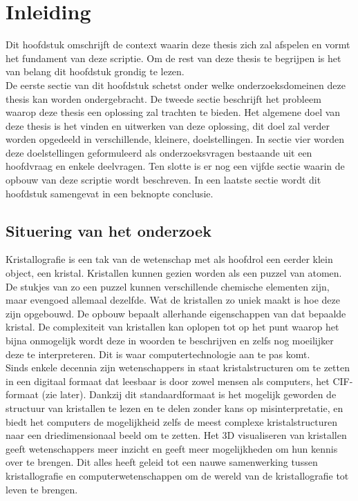 

\chapter{Inleiding}
Dit hoofdstuk omschrijft de context waarin deze thesis zich zal afspelen en vormt het fundament van deze scriptie. Om de rest van deze thesis te begrijpen is het van belang dit hoofdstuk grondig te lezen. 
\\
De eerste sectie van dit hoofdstuk schetst onder welke onderzoeksdomeinen deze thesis kan worden ondergebracht. De tweede sectie beschrijft het probleem waarop deze thesis een oplossing zal trachten te bieden. Het algemene doel van deze thesis is het vinden en uitwerken van deze oplossing, dit doel zal verder worden opgedeeld in verschillende, kleinere, doelstellingen. In sectie vier worden deze doelstellingen geformuleerd als onderzoeksvragen  bestaande uit een hoofdvraag en enkele deelvragen. Ten slotte is er nog een vijfde sectie waarin de opbouw van deze scriptie wordt beschreven. In een laatste sectie wordt dit hoofdstuk samengevat in een beknopte conclusie.

\section{Situering van het onderzoek}
Kristallografie is een tak van de wetenschap met als hoofdrol een eerder klein object, een kristal. Kristallen kunnen gezien worden als een puzzel van atomen. De stukjes van zo een puzzel kunnen verschillende chemische elementen zijn, maar evengoed allemaal dezelfde. Wat de kristallen zo uniek maakt is hoe deze zijn opgebouwd. De opbouw bepaalt allerhande eigenschappen van dat bepaalde kristal. De complexiteit van kristallen kan oplopen tot op het punt waarop het bijna onmogelijk wordt deze in woorden te beschrijven en zelfs nog moeilijker deze te interpreteren. Dit is waar computertechnologie aan te pas komt. 
\\
Sinds enkele decennia zijn wetenschappers in staat kristalstructuren om te zetten in een digitaal formaat dat leesbaar is door zowel mensen als computers, het CIF-formaat (zie later). Dankzij dit standaardformaat is het mogelijk geworden de structuur van kristallen te lezen en te delen zonder kans op misinterpretatie, en biedt het computers de mogelijkheid zelfs de meest complexe kristalstructuren naar een driedimensionaal beeld om te zetten. Het 3D visualiseren van kristallen geeft wetenschappers meer inzicht en geeft meer mogelijkheden om hun kennis over te brengen. Dit alles heeft geleid tot een nauwe samenwerking tussen kristallografie en computerwetenschappen om de wereld van de kristallografie tot leven te brengen.


